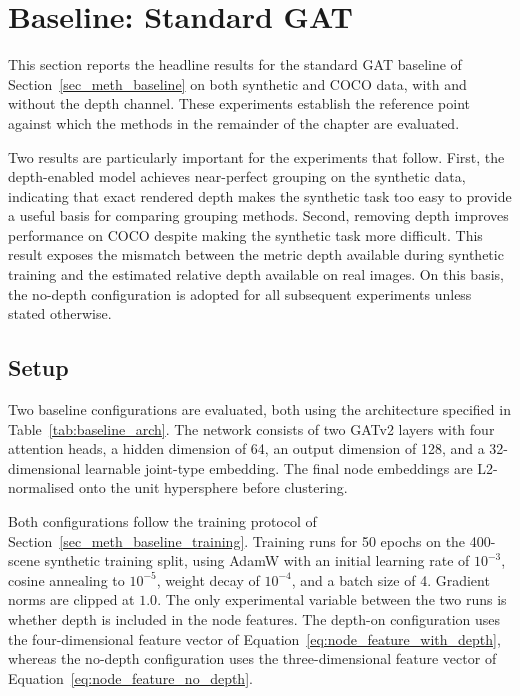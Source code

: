 \section{Baseline: Standard GAT}
\label{sec_res_baseline}

This section reports the headline results for the standard GAT baseline
of Section~\ref{sec_meth_baseline} on both synthetic and COCO data,
with and without the depth channel.
These experiments establish the reference point against which the methods
in the remainder of the chapter are evaluated.

Two results are particularly important for the experiments that follow.
First, the depth-enabled model achieves near-perfect grouping
on the synthetic data,
indicating that exact rendered depth makes the synthetic task
too easy to provide a useful basis for comparing grouping methods.
Second, removing depth improves performance on COCO
despite making the synthetic task more difficult.
This result exposes the mismatch between the metric depth available
during synthetic training and the estimated relative depth available
on real images.
On this basis, the no-depth configuration is adopted for all subsequent
experiments unless stated otherwise.

\subsection{Setup}
\label{sec_res_baseline_setup}

Two baseline configurations are evaluated,
both using the architecture specified in Table~\ref{tab:baseline_arch}.
The network consists of two GATv2 layers with four attention heads,
a hidden dimension of 64,
an output dimension of 128,
and a 32-dimensional learnable joint-type embedding.
The final node embeddings are L2-normalised onto the unit hypersphere
before clustering.

Both configurations follow the training protocol of
Section~\ref{sec_meth_baseline_training}.
Training runs for 50 epochs on the 400-scene synthetic training split,
using AdamW with an initial learning rate of $10^{-3}$,
cosine annealing to $10^{-5}$,
weight decay of $10^{-4}$,
and a batch size of 4.
Gradient norms are clipped at $1.0$.
The only experimental variable between the two runs is whether depth
is included in the node features.
The depth-on configuration uses the four-dimensional feature vector
of Equation~\eqref{eq:node_feature_with_depth},
whereas the no-depth configuration uses the three-dimensional feature
vector of Equation~\eqref{eq:node_feature_no_depth}.

